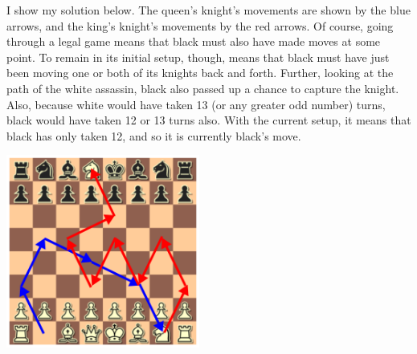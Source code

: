 \documentclass{article}
\begin{document}
I show my solution below.
The queen's knight's movements are shown by the blue arrows, and the king's knight's movements by the red arrows.
Of course, going through a legal game means that black must also have made moves at some point.
To remain in its initial setup, though, means that black must have just been moving one or both of its knights back and forth.
Further, looking at the path of the white assassin, black also passed up a chance to capture the knight.
Also, because white would have taken 13 (or any greater odd number) turns, black would have taken 12 or 13 turns also.
With the current setup, it means that black has only taken 12, and so it is currently black's move.

\begin{center}
\includegraphics[width=2.5in]{chess2.png}
\end{center}
\end{document}
